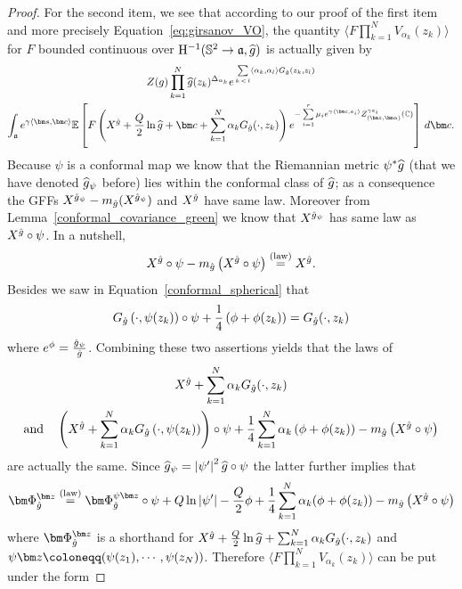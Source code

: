 \documentclass[AHL,Unicode,longabstracts,published]{cedram}
\newcommand{\frka}{\mathfrak{a}}
\newcommand{\rmH}{\mathrm{H}}
\newcommand{\C}{\mathbb{C}}
\renewcommand*\S{\mathbb{S}}
\newcommand{\E}{\mathbb{E}}
\newcommand{\eqlaw}{\overset{\text{(law)}}{=}}
\newcommand{\ps}[1]{\langle #1 \rangle}
\newcommand{\norm}[1]{\left\lvert#1\right\rvert}
\let\oldhat\hat
\renewcommand*{\hat}[1]{\mathchoice{\widehat{#1}}{\widehat{#1}}{\oldhat{#1}}{\oldhat{#1}}}
\begin{document}
\begin{proof}
For the second item, we see that according to our proof of the first item and more precisely Equation~\eqref{eq:girsanov_VO}, the quantity $\ps{F\prod_{k=1}^NV_{\alpha_k}(z_k)}$ for $F$ bounded continuous over $\rmH^{-1}(\S^2\to\frka,\hat g)$ is actually given by
\begin{multline*}
Z(g)\prod_{k=1}^N \hat g (z_k)^{\Delta_{\alpha_k}}e^{\, \sum\limits_{k\,<\,l} \langle\alpha_k,\alpha_l \rangle G_{\hat g}(z_k,z_l) }\\
\int_{ \frka} e^{\gamma \ps{\bm s,\bm c}}\E \left [F\left(X^{\hat g}+\frac Q2\ln\hat g+\bm c+\sum\limits_{k=1}^N\alpha_kG_{\hat g}(\cdot,z_k)\right)e^{- \sum\limits_{i=1}^{r} \mu_i e^{\gamma \langle \bm c,e_i\rangle }Z_{(\bm z,\bm \alpha)}^{\gamma e_i} (\C)} \right]\,d\bm c.
\end{multline*}
Because $\psi$ is a conformal map we know that the Riemannian metric $\psi^*\hat g$ (that we have denoted $\hat{g}_\psi$ before) lies within the conformal class of $\hat g$; as a consequence the GFFs $X^{\hat g_\psi}-m_{\hat g}(X^{\hat g_\psi})$ and $X^{\hat g}$ have same law. Moreover from Lemma~\ref{conformal_covariance_green} we know that $X^{\hat g_\psi}$ has same law as $X^{\hat g}\circ\psi$. In a nutshell,
\[
X^{\hat g}\circ\psi-m_{\hat g}\left(X^{\hat g}\circ\psi\right)\eqlaw X^{\hat g}.
\]
Besides we saw in Equation~\eqref{conformal_spherical} that
\[
G_{\hat g}\left(\cdot,\psi(z_k)\right)\circ\psi+\frac14\left(\phi+\phi(z_k)\right)=G_{\hat g}(\cdot,z_k)
\]
where $e^{\phi}=\frac{\hat g_\psi}{\hat g}$. Combining these two assertions yields that the laws of
\begin{multline*}
X^{\hat g}+\sum_{k=1}^N\alpha_kG_{\hat g}(\cdot,z_k)\\
\text{and}\quad\left(X^{\hat g}+\sum_{k=1}^N\alpha_kG_{\hat g}\left(\cdot,\psi(z_k)\right)\right)\circ\psi+\frac14\sum_{k=1}^N\alpha_k\left(\phi+\phi(z_k)\right)-m_{\hat g}\left(X^{\hat g}\circ\psi\right)
\end{multline*}
are actually the same. Since $\hat g_\psi=\norm{\psi'}^2\hat g\circ\psi$ the latter further implies that
\[
\bm\Phi_{\hat g}^{\bm z}\eqlaw \bm\Phi_{\hat g}^{\psi\bm z}\circ\psi+ Q\ln\norm{\psi'}-\frac Q2\phi+\frac14\sum_{k=1}^N\alpha_k(\phi+\phi(z_k))-m_{\hat g}\left(X^{\hat g}\circ\psi\right)
\]
where $\bm\Phi_{\hat g}^{\bm z}$ is a shorthand for $X^{\hat g}+\frac Q2\ln\hat g+\sum_{k=1}^N\alpha_kG_{\hat g}(\cdot,z_k)$ and $\psi\bm z\coloneqq (\psi(z_1),\cdots,\linebreak\psi(z_N))$. Therefore $\ps{F\prod_{k=1}^NV_{\alpha_k}(z_k)}$ can be put under the form

\end{proof}
\end{document}
